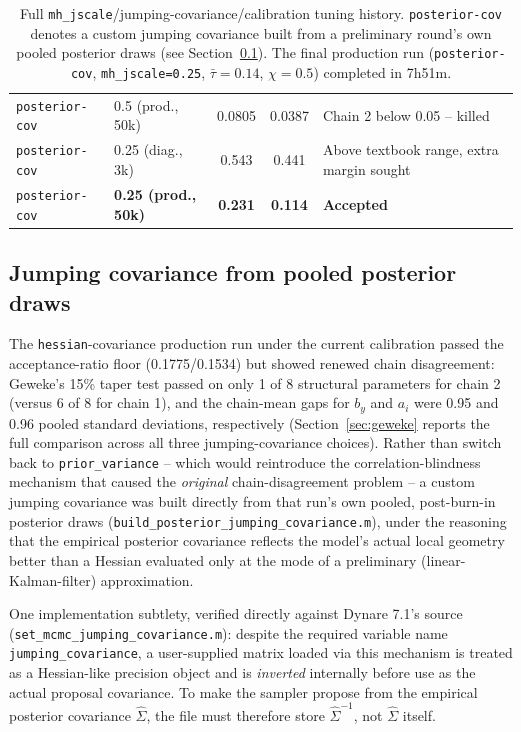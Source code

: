 \documentclass[11pt]{article}
\begin{document}
\begin{table}[h]
\begin{tabular}{@{}llccl@{}}
\texttt{posterior-cov} & 0.5 (prod., 50k) & 0.0805 & 0.0387 & Chain 2 below 0.05 -- killed \\
\texttt{posterior-cov} & 0.25 (diag., 3k) & 0.543 & 0.441 & Above textbook range, extra margin sought \\
\texttt{posterior-cov} & \textbf{0.25 (prod., 50k)} & \textbf{0.231} & \textbf{0.114} & \textbf{Accepted} \\
\bottomrule
\end{tabular}
\caption{Full \texttt{mh\_jscale}/jumping-covariance/calibration tuning
history. \texttt{posterior-cov} denotes a custom jumping covariance
built from a preliminary round's own pooled posterior draws (see
Section~\ref{sec:postcov}). The final production run
(\texttt{posterior-cov}, \texttt{mh\_jscale=0.25}, $\bar\tau=0.14$,
$\chi=0.5$) completed in 7h51m.}
\label{tab:jscale}
\end{table}

\subsection{Jumping covariance from pooled posterior draws}
\label{sec:postcov}
The \texttt{hessian}-covariance production run under the current
calibration passed the acceptance-ratio floor (0.1775/0.1534) but
showed renewed chain disagreement: Geweke's 15\% taper test passed on
only 1 of 8 structural parameters for chain 2 (versus 6 of 8 for chain
1), and the chain-mean gaps for $b_y$ and $a_i$ were 0.95 and 0.96
pooled standard deviations, respectively (Section~\ref{sec:geweke}
reports the full comparison across all three jumping-covariance
choices). Rather than switch back to \texttt{prior\_variance} -- which
would
reintroduce the correlation-blindness mechanism that caused the
\emph{original} chain-disagreement problem -- a custom jumping
covariance was built directly from that run's own pooled, post-burn-in
posterior draws (\texttt{build\_posterior\_jumping\_covariance.m}),
under the reasoning that the empirical posterior covariance reflects
the model's actual local geometry better than a Hessian evaluated only
at the mode of a preliminary (linear-Kalman-filter) approximation.

One implementation subtlety, verified directly against Dynare 7.1's
source (\texttt{set\_mcmc\_jumping\_covariance.m}): despite the required
variable name \texttt{jumping\_covariance}, a user-supplied matrix
loaded via this mechanism is treated as a Hessian-like precision object
and is \emph{inverted} internally before use as the actual proposal
covariance. To make the sampler propose from the empirical posterior
covariance $\hat\Sigma$, the file must therefore store
$\hat\Sigma^{-1}$, not $\hat\Sigma$ itself.
\end{document}
